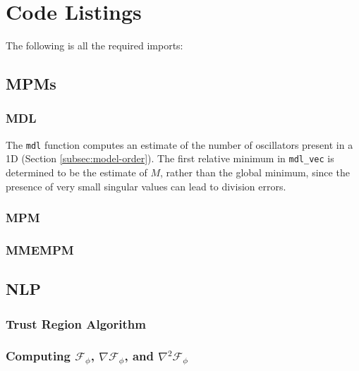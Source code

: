 \chapter{Code Listings}

The following is all the required imports:

\section{\Aclp{MPM}}

\subsection{\acs{MDL}}
The \texttt{mdl} function computes an estimate of the number of
oscillators present in a \ac{1D}  (Section \ref{subsec:model-order}).
The first relative minimum in \texttt{mdl_vec} is determined to be
the estimate of $M$, rather than the global minimum, since the presence of very
small singular values can lead to division errors.

\subsection{\acs{MPM}}

\subsection{\acs{MMEMPM}}

\section{\ac{NLP}}

\subsection{Trust Region Algorithm}


\subsection{Computing
    \texorpdfstring{$\mathcal{F}_{\phi}$}{F},
    \texorpdfstring{$\nabla \mathcal{F}_{\phi}$}{grad}, and
    \texorpdfstring{$\nabla^2 \mathcal{F}_{\phi}$}{hess}
}

